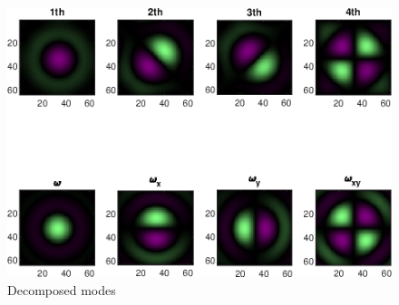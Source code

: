 \documentclass{article}
\numberwithin{equation}{section}
\begin{document}
\begin{enumerate}[leftmargin=*]
\begin{figure}[H]
\includegraphics[width=0.9\linewidth]{../figures/gradients.eps} 
\caption{Decomposed modes} 
 \end{figure}
 

\end{enumerate}
\end{document}
